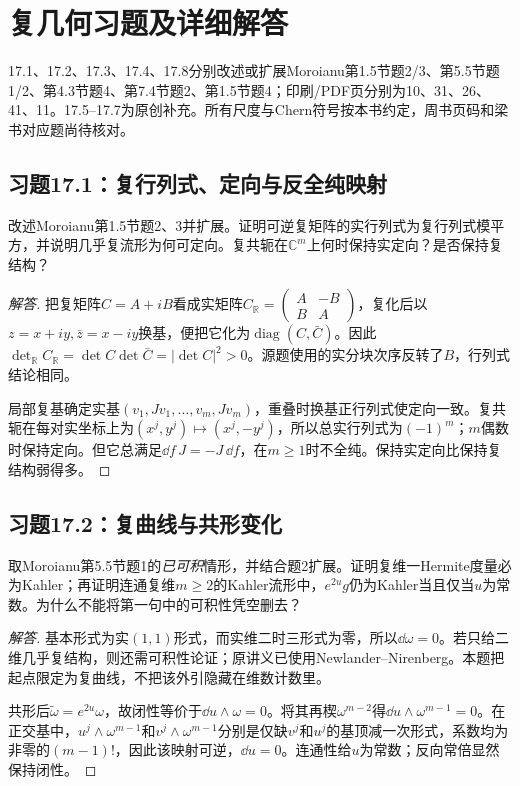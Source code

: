 \section{复几何习题及详细解答}
17.1、17.2、17.3、17.4、17.8分别改述或扩展Moroianu第1.5节题2/3、第5.5节题1/2、第4.3节题4、第7.4节题2、第1.5节题4；印刷/PDF页分别为10、31、26、41、11。17.5--17.7为原创补充。所有尺度与Chern符号按本书约定，周书页码和梁书对应题尚待核对。

\subsection*{习题17.1：复行列式、定向与反全纯映射}
改述Moroianu第1.5节题2、3并扩展。证明可逆复矩阵的实行列式为复行列式模平方，并说明几乎复流形为何可定向。复共轭在$\mathbb C^m$上何时保持实定向？是否保持复结构？
\begin{proof}[解答]
把复矩阵$C=A+iB$看成实矩阵$C_{\mathbb R}=\left(\begin{smallmatrix}A&-B\\B&A\end{smallmatrix}\right)$，复化后以$z=x+iy,\bar z=x-iy$换基，便把它化为$\operatorname{diag}(C,\bar C)$。因此$\det_{\mathbb R}C_{\mathbb R}=\det C\det\bar C=|\det C|^2>0$。源题使用的实分块次序反转了$B$，行列式结论相同。

局部复基确定实基$(v_1,Jv_1,\ldots,v_m,Jv_m)$，重叠时换基正行列式使定向一致。复共轭在每对实坐标上为$(x^j,y^j)\mapsto(x^j,-y^j)$，所以总实行列式为$(-1)^m$；$m$偶数时保持定向。但它总满足$\dd f\,J=-J\,\dd f$，在$m\geq1$时不全纯。保持实定向比保持复结构弱得多。
\end{proof}

\subsection*{习题17.2：复曲线与共形变化}
取Moroianu第5.5节题1的\emph{已可积}情形，并结合题2扩展。证明复维一Hermite度量必为Kahler；再证明连通复维$m\geq2$的Kahler流形中，$e^{2u}g$仍为Kahler当且仅当$u$为常数。为什么不能将第一句中的可积性凭空删去？
\begin{proof}[解答]
基本形式为实$(1,1)$形式，而实维二时三形式为零，所以$\dd\omega=0$。若只给二维几乎复结构，则还需可积性论证；原讲义已使用Newlander--Nirenberg。本题把起点限定为复曲线，不把该外引隐藏在维数计数里。

共形后$\widetilde\omega=e^{2u}\omega$，故闭性等价于$\dd u\wedge\omega=0$。将其再楔$\omega^{m-2}$得$\dd u\wedge\omega^{m-1}=0$。在正交基中，$u^j\wedge\omega^{m-1}$和$v^j\wedge\omega^{m-1}$分别是仅缺$v^j$和$u^j$的基顶减一次形式，系数均为非零的$(m-1)!$，因此该映射可逆，$\dd u=0$。连通性给$u$为常数；反向常倍显然保持闭性。
\end{proof}

